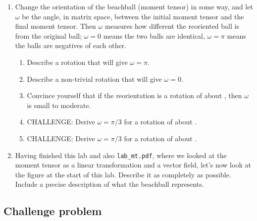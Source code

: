 \documentclass[11pt,titlepage,fleqn]{article}
\newcommand{\tvec}{\textcolor{red}{\mbt}}
\newcommand{\bvec}{\textcolor{blue}{\mbb}}
\newcommand{\pvec}{\textcolor{black}{\mbp}}
\newcommand{\nvec}{\mbn}
\newcommand{\svec}{\mbs}
\begin{document}
\begin{enumerate}
\begin{enumerate}
\end{enumerate}


\item Change the orientation of the beachball (moment tensor) in some way, and let $\omega$ be the angle, in matrix space, between the initial moment tensor and the final moment tensor. Then $\omega$ measures how different the reoriented ball is from the original ball; $\omega=0$ means the two balls are identical, $\omega=\pi$ means the balls are negatives of each other.

\begin{enumerate}
\item Describe a rotation that will give $\omega=\pi$.

\item Describe a non-trivial rotation that will give $\omega=0$.

\item Convince yourself that if the reorientation is a rotation of  about \pvec, then $\omega$ is small to moderate.

\item CHALLENGE: Derive $\omega=\pi/3$ for a rotation of  about \pvec.

\item CHALLENGE: Derive $\omega=\pi/3$ for a rotation of  about \tvec.

\end{enumerate}






\item Having finished this lab and also \verb+lab_mt.pdf+, where we looked at the moment tensor as a linear transformation and a vector field, let's now look at the figure at the start of this lab. Describe it as completely as possible. Include a precise description of what the beachball represents.

\end{enumerate}

\subsection*{Challenge problem}
\end{document}
